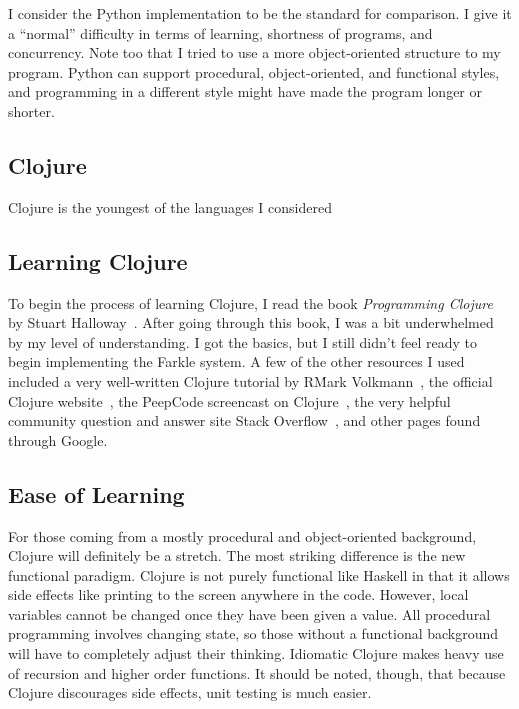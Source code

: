 \documentclass{article}
\begin{document}
I consider the Python implementation to be the standard for comparison.  I give
it a ``normal'' difficulty in terms of learning, shortness of programs, and
concurrency.  Note too that I tried to use a more object-oriented structure to
my program.  Python can support procedural, object-oriented, and functional
styles, and programming in a different style might have made the program longer
or shorter.

\subsection{Clojure}

Clojure is the youngest of the languages I considered

\subsection{Learning Clojure}

To begin the process of learning Clojure, I read the book \emph{Programming
Clojure} by Stuart Halloway~\cite{clojurebook}.  After going through this book,
I was a bit underwhelmed by my level of understanding.  I got the basics, but I
still didn't feel ready to begin implementing the Farkle system.  A few of the
other resources I used included a very well-written Clojure tutorial by R\. Mark
Volkmann~\cite{clojuretutorial}, the official Clojure
website~\cite{clojuredotorg}, the PeepCode screencast on
Clojure~\cite{peepcodeclojure}, the very helpful community question and answer
site Stack Overflow~\cite{stackoverflow}, and other pages found through Google.

\subsection{Ease of Learning}

For those coming from a mostly procedural and object-oriented background,
Clojure will definitely be a stretch.  The most striking difference is the new
functional paradigm.  Clojure is not purely functional like Haskell in that it
allows side effects like printing to the screen anywhere in the code.  However,
local variables cannot be changed once they have been given a value.  All
procedural programming involves changing state, so those without a functional
background will have to completely adjust their thinking.  Idiomatic Clojure
makes heavy use of recursion and higher order functions.  It should be noted,
though, that because Clojure discourages side effects, unit testing is much
easier.
\end{document}
